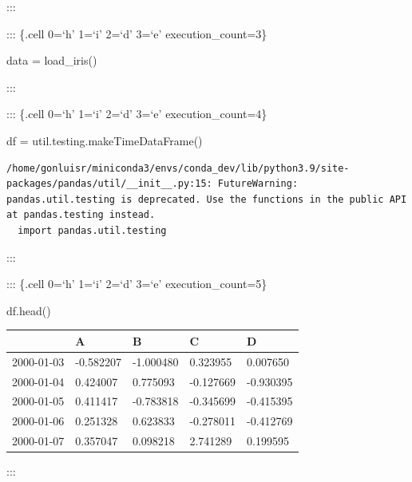\documentclass[
  letterpaper,
  DIV=11,
  numbers=noendperiod]{scrartcl}
\newenvironment{Shaded}{\begin{snugshade}}{\end{snugshade}}
\newcommand{\NormalTok}[1]{\textcolor[rgb]{0.00,0.23,0.31}{#1}}
\newcommand{\OperatorTok}[1]{\textcolor[rgb]{0.37,0.37,0.37}{#1}}
\begin{document}
:::

::: \{.cell 0=`h' 1=`i' 2=`d' 3=`e' execution\_count=3\}

\begin{Shaded}
\begin{Highlighting}[]
\NormalTok{data }\OperatorTok{=}\NormalTok{ load\_iris()}
\end{Highlighting}
\end{Shaded}

:::

::: \{.cell 0=`h' 1=`i' 2=`d' 3=`e' execution\_count=4\}

\begin{Shaded}
\begin{Highlighting}[]
\NormalTok{df }\OperatorTok{=}\NormalTok{ util.testing.makeTimeDataFrame()}
\end{Highlighting}
\end{Shaded}

\begin{verbatim}
/home/gonluisr/miniconda3/envs/conda_dev/lib/python3.9/site-packages/pandas/util/__init__.py:15: FutureWarning: pandas.util.testing is deprecated. Use the functions in the public API at pandas.testing instead.
  import pandas.util.testing
\end{verbatim}

:::

::: \{.cell 0=`h' 1=`i' 2=`d' 3=`e' execution\_count=5\}

\begin{Shaded}
\begin{Highlighting}[]
\NormalTok{df.head()}
\end{Highlighting}
\end{Shaded}

\begin{longtable}[]{@{}lllll@{}}
\toprule()
& A & B & C & D \\
\midrule()
\endhead
2000-01-03 & -0.582207 & -1.000480 & 0.323955 & 0.007650 \\
2000-01-04 & 0.424007 & 0.775093 & -0.127669 & -0.930395 \\
2000-01-05 & 0.411417 & -0.783818 & -0.345699 & -0.415395 \\
2000-01-06 & 0.251328 & 0.623833 & -0.278011 & -0.412769 \\
2000-01-07 & 0.357047 & 0.098218 & 2.741289 & 0.199595 \\
\bottomrule()
\end{longtable}

:::
\end{document}
